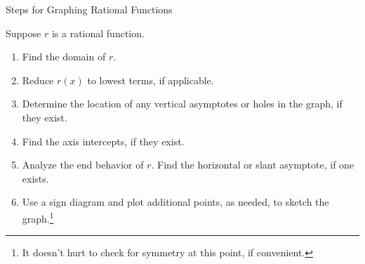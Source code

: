 \begin{floatbox}[label=box:graphingrationalfunctions]{Steps for Graphing Rational Functions}

Suppose $r$ is a rational function. 

\begin{enumerate}

\item  Find the domain of $r$.

\item  Reduce $r(x)$ to lowest terms, if applicable.

\item  Determine the location of any vertical asymptotes or holes in the graph, if they exist. 

\item  Find the axis intercepts, if they exist.

\item  Analyze the end behavior of $r$.  Find the horizontal or slant asymptote, if one exists.

\item  Use a sign diagram and plot additional points, as needed, to sketch the graph.\footnote{It doesn't hurt to check for symmetry at this point, if convenient.}

\end{enumerate}

\end{floatbox}

